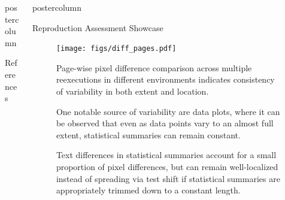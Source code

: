 \begin{frame}
\begin{columns}
\begin{column}{.42\textwidth}
\begin{beamercolorbox}[center]{postercolumn}
\begin{minipage}{.98\textwidth}
{\begin{myblock}{References}
\begin{minipage}{.69\textwidth}
                                                        
                                                        
						\end{minipage}
					\end{myblock}\vfill
		}\end{minipage}\end{beamercolorbox}
	\end{column}
	\begin{column}{.59\textwidth}
		\begin{beamercolorbox}[center]{postercolumn}
			\begin{minipage}{.98\textwidth} %
				\parbox[t][\columnheight]{\textwidth}{ %
					\begin{myblock}{Reproduction Assessment Showcase}
						\vspace{-0.45em}
						\begin{minipage}{.58\textwidth}
						\begin{figure}
							\texttt{[image: figs/diff\_pages.pdf]}
							\vspace{0.2em}
							\caption{
								Page-wise pixel difference comparison across multiple reexecutions in different environments indicates consistency of variability in both extent and location.
							}
							\label{fig:ras_s}
						\end{figure}
						\begin{figure}
							\vspace{0.2em}
							\caption{
								One notable source of variability are data plots, where it can be observed that even as data points vary to an almost full extent, statistical summaries can remain constant.
							}
						\end{figure}
						\end{minipage}
						\hfill
						\begin{minipage}{.38\textwidth}
						\vspace{1.3em}
						\begin{figure}
							\vspace{0.5em}
							\caption{
								Text differences in statistical summaries account for a small proportion of pixel differences, but can remain well-localized instead of spreading via test shift if statistical summaries are appropriately trimmed down to a constant length.
}
\end{figure}
\end{minipage}
\end{myblock}}
\end{minipage}
\end{beamercolorbox}
\end{column}
\end{columns}
\end{frame}
